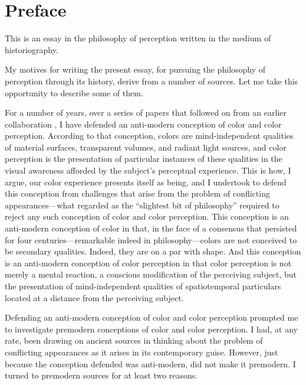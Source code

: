 \chapter*{Preface} %
\label{cha:preface}


This is an essay in the philosophy of perception written in the medium of historiography. 

My motives for writing the present essay, for pursuing the philosophy of perception through its history, derive from a number of sources. Let me take this opportunity to describe some of them.

For a number of years, over a series of papers \citep{Kalderon:2006tg,Kalderon:2008fk,Kalderon:2010fj,Kalderon:2007mr,Kalderon:2011fk} that followed on from an earlier collaboration \citep{Hilbert:2000on}, I have defended an anti-modern conception of color and color perception. According to that conception, colors are mind-independent qualities of material surfaces, transparent volumes, and radiant light sources, and color perception is the presentation of particular instances of these qualities in the visual awareness afforded by the subject's perceptual experience. This is how, I argue, our color experience presents itself as being, and I undertook to defend this conception from challenges that arise from the problem of conflicting appearances---what \citet{Hume:1748zr} regarded as the ``slightest bit of philosophy'' required to reject any such conception of color and color perception. This conception is an anti-modern conception of color in that, in the face of a consensus that persisted for four centuries---remarkable indeed in philosophy---colors are not conceived to be secondary qualities. Indeed, they are on a par with shape. And this conception is an anti-modern conception of color perception in that color perception is not merely a mental reaction, a conscious modification of the perceiving subject, but the presentation of mind-independent qualities of spatiotemporal particulars located at a distance from the perceiving subject. 

Defending an anti-modern conception of color and color perception prompted me to investigate premodern conceptions of color and color perception. I had, at any rate, been drawing on ancient sources in thinking about the problem of conflicting appearances as it arises in its contemporary guise. However, just because the conception defended was anti-modern, did not make it premodern. I turned to premodern sources for at least two reasons. 

